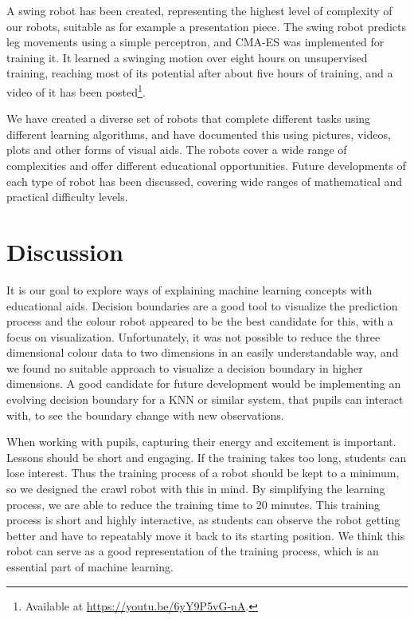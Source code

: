 \documentclass[11pt, a4paper]{article}
\begin{document}
	A swing robot has been created, representing the highest level of complexity of our robots, suitable as for example a presentation piece. The swing robot predicts leg movements using a simple perceptron, and CMA-ES was implemented for training it. It learned a swinging motion over eight hours on unsupervised training, reaching most of its potential after about five hours of training, and a video of it has been posted\footnote{Available at \url{https://youtu.be/6yY9P5vG-nA}.}. 
	\medskip
	
	We have created a diverse set of robots that complete different tasks using different learning algorithms, and have documented this using pictures, videos, plots and other forms of visual aids. The robots cover a wide range of complexities and offer different educational opportunities. Future developments of each type of robot has been discussed, covering wide ranges of mathematical and practical difficulty levels.
	
	\section{Discussion}
	It is our goal to explore ways of explaining machine learning concepts with educational aids. Decision boundaries are a good tool to visualize the prediction process and the colour robot appeared to be the best candidate for this, with a focus on visualization. Unfortunately, it was not possible to reduce the three dimensional colour data to two dimensions in an easily understandable way, and we found no suitable approach to visualize a decision boundary in higher dimensions. A good candidate for future development would be implementing an evolving decision boundary for a KNN or similar system, that pupils can interact with, to see the boundary change with new observations.
	\medskip
	
	When working with pupils, capturing their energy and excitement is important. Lessons should be short and engaging. If the training takes too long, students can lose interest. Thus the training process of a robot should be kept to a minimum, so we designed the crawl robot with this in mind. By simplifying the learning process, we are able to reduce the training time to 20 minutes. This training process is short and highly interactive, as students can observe the robot getting better and have to repeatably move it back to its starting position. We think this robot can serve as a good representation of the training process, which is an essential part of machine learning.
	\medskip
	
\end{document}
